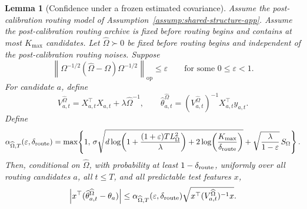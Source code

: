 \documentclass{article} %
\newtheorem{lemma}[theorem]{Lemma}
\begin{document}
\begin{lemma}[Confidence under a frozen estimated covariance]
\label{lem:confidence-under-frozen-omegahat-final}
Assume the post-calibration routing model of
Assumption~\ref{assump:shared-structure-app}.  Assume the post-calibration
routing archive is fixed before routing begins and contains at most
\(K_{\max}\) candidates.  Let \(\widehat\Omega\succ0\) be fixed before routing
begins and independent of the post-calibration routing noises.  Suppose
\[
\left\|
\Omega^{-1/2}(\widehat\Omega-\Omega)\Omega^{-1/2}
\right\|_{\mathrm{op}}
\le \varepsilon
\qquad\text{for some }0\le\varepsilon<1.
\]
For candidate \(a\), define
\[
V_{a,t}^{\widehat\Omega}
=
X_{a,t}^\top X_{a,t}+\lambda\widehat\Omega^{-1},
\qquad
\widehat\theta_{a,t}^{\widehat\Omega}
=
(V_{a,t}^{\widehat\Omega})^{-1}X_{a,t}^\top y_{a,t}.
\]
Define
\[
\alpha_{\widehat\Omega,T}(\varepsilon,\delta_{\rm route})
=
\max\!\left\{
1,\,
\sigma
\sqrt{
d\log\!\left(1+\frac{(1+\varepsilon)TL_\Omega^2}{\lambda}\right)
+
2\log\!\left(\frac{K_{\max}}{\delta_{\rm route}}\right)
}
+
\sqrt{\frac{\lambda}{1-\varepsilon}}\,S_\Omega
\right\}.
\]
Then, conditional on \(\widehat\Omega\), with probability at least
\(1-\delta_{\rm route}\), uniformly over all routing candidates \(a\), all
\(t\le T\), and all predictable test features \(x\),
\[
\left|
x^\top(\widehat\theta_{a,t}^{\widehat\Omega}-\theta_a)
\right|
\le
\alpha_{\widehat\Omega,T}(\varepsilon,\delta_{\rm route})
\sqrt{x^\top(V_{a,t}^{\widehat\Omega})^{-1}x}.
\]
\end{lemma}
\end{document}
